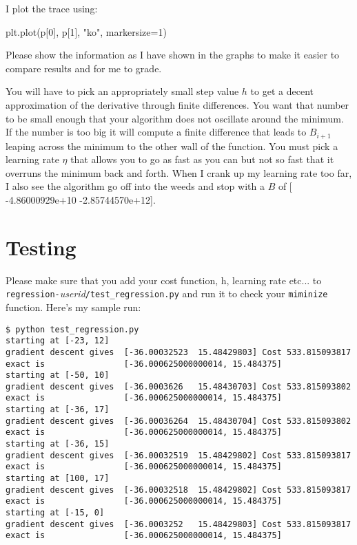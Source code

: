 \documentclass[titlepage]{tufte-book}
\begin{document}
\begin{fullwidth}
\noindent I plot the trace using:

\begin{pyverbatim}
plt.plot(p[0], p[1], "ko", markersize=1)
\end{pyverbatim}

Please show the information as I have shown in the graphs to make it easier to compare results and for me to grade. 

You will have to pick an appropriately small step value $h$ to get a decent approximation of the derivative through finite differences. You want that number to be small enough that your algorithm does not oscillate around the minimum. If the number is too big it will compute a finite difference that leads to $B_{i+1}$ leaping across the minimum to the other wall of the function. You must pick a learning rate $\eta$ that allows you to go as fast as you can but not so fast that it overruns the minimum back and forth. When I crank up my learning rate too far, I also see the algorithm go off into the weeds and stop with a  $B$ of [ -4.86000929e+10  -2.85744570e+12].

\section{Testing}

Please make sure that you add your cost function, h, learning rate etc... to {\tt regression-}{\em userid}{\tt /test\_regression.py} and run it to check your {\tt miminize} function.  Here's my sample run:

\begin{lstlisting}[style=BashInputStyle]
$ python test_regression.py
starting at [-23, 12]
gradient descent gives  [-36.00032523  15.48429803] Cost 533.815093817
exact is                [-36.000625000000014, 15.484375]
starting at [-50, 10]
gradient descent gives  [-36.0003626   15.48430703] Cost 533.815093802
exact is                [-36.000625000000014, 15.484375]
starting at [-36, 17]
gradient descent gives  [-36.00036264  15.48430704] Cost 533.815093802
exact is                [-36.000625000000014, 15.484375]
starting at [-36, 15]
gradient descent gives  [-36.00032519  15.48429802] Cost 533.815093817
exact is                [-36.000625000000014, 15.484375]
starting at [100, 17]
gradient descent gives  [-36.00032518  15.48429802] Cost 533.815093817
exact is                [-36.000625000000014, 15.484375]
starting at [-15, 0]
gradient descent gives  [-36.0003252   15.48429803] Cost 533.815093817
exact is                [-36.000625000000014, 15.484375]
\end{lstlisting}


\end{fullwidth}
\end{document}
